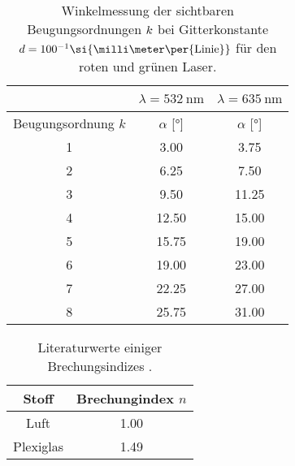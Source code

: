 \begin{table}
    \centering
    \caption{Winkelmessung der sichtbaren Beugungsordnungen $\protect k$ bei Gitterkonstante $\protect d = {100^{-1}}\si{\milli\meter\per{\text{Linie}}}$ für den roten und grünen Laser.}
    \label{tab:100linien}
    \begin{tabular}{c || c | c }
        \multicolumn{1}{c}{~} &\multicolumn{1}{c}{$\lambda = \SI{532}{\nano\meter}$} & \multicolumn{1}{c}{$\lambda = \SI{635}{\nano\meter}$} \\
        \midrule
        Beugungsordnung $k$  & $\alpha$ [$\si{\degree}$]  & $\alpha$ [$\si{\degree}$] \\
        \midrule
        1    &    3.00    & 3.75 \\ 
        2    &    6.25    & 7.50 \\ 
        3    &    9.50    & 11.25 \\ 
        4    &   12.50    & 15.00 \\
        5    &   15.75    & 19.00 \\
        6    &   19.00    & 23.00 \\
        7    &   22.25    & 27.00 \\
        8    &   25.75    & 31.00 \\
        \bottomrule
    \end{tabular}
\end{table}

\begin{table}
    \caption{Literaturwerte einiger Brechungsindizes \cite{lit2} \cite{lit3}.}
    \centering
    \label{tab:litindex}
    \begin{tabular}{c c}
        \toprule
        Stoff & Brechungindex $n$\\
        \midrule
        Luft  &  1.00    \\
        Plexiglas  &   1.49   \\
        \bottomrule    
    \end{tabular}
\end{table}


